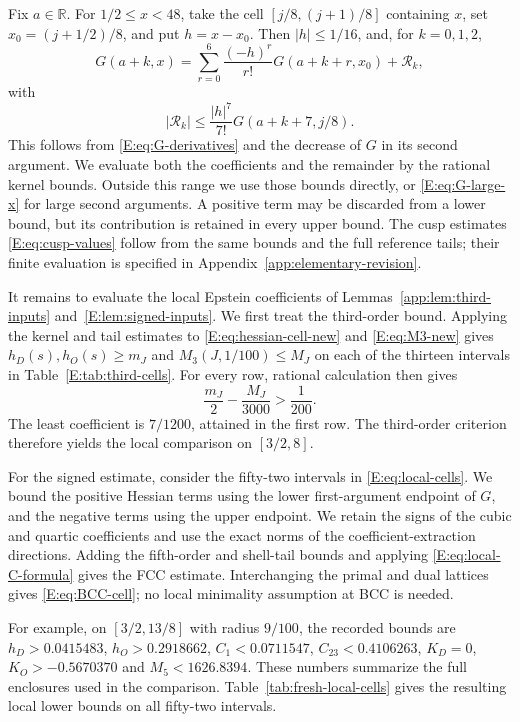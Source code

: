 \documentclass[reqno,english]{amsart}
\theoremstyle{definition}
\newtheorem{open problem}[theorem]{Open Problem}
\theoremstyle{remark}
\theoremstyle{plain}
\newcommand{\R}{{\mathbb R}}
\numberwithin{equation}{section}
\begin{document}
Fix $a\in\R$. For $1/2\le x<48$, take the cell
$[j/8,(j+1)/8]$ containing $x$, set $x_0=(j+1/2)/8$, and put
$h=x-x_0$. Then $|h|\le1/16$, and, for $k=0,1,2$,
\begin{equation}
 G(a+k,x)=\sum_{r=0}^{6}\frac{(-h)^r}{r!}G(a+k+r,x_0)+\mathcal R_k,
 \label{E:eq:kernel-Taylor}
\end{equation}
with
\begin{equation}
 |\mathcal R_k|\le\frac{|h|^7}{7!}G(a+k+7,j/8).
 \label{E:eq:kernel-Taylor-error}
\end{equation}
This follows from \eqref{E:eq:G-derivatives} and the decrease of
$G$ in its second argument. We evaluate both the coefficients and the
remainder by the rational kernel bounds. Outside this range we use
those bounds directly, or \eqref{E:eq:G-large-x} for large second
arguments. A positive term may be discarded from a lower bound, but
its contribution is retained in every upper bound. The cusp estimates
\eqref{E:eq:cusp-values} follow from the same bounds and the full
reference tails; their finite evaluation is specified in
Appendix~\ref{app:elementary-revision}.

It remains to evaluate the local Epstein coefficients of
Lemmas~\ref{app:lem:third-inputs} and~\ref{E:lem:signed-inputs}.
We first treat the third-order bound. Applying the kernel and tail
estimates to \eqref{E:eq:hessian-cell-new} and \eqref{E:eq:M3-new}
gives $h_D(s),h_O(s)\ge m_J$ and $M_3(J,1/100)\le M_J$ on each
of the thirteen intervals in Table~\ref{E:tab:third-cells}.
For every row, rational calculation then gives
\[
 \frac{m_J}{2}-\frac{M_J}{3000}>\frac1{200}.
\]
The least coefficient is $7/1200$, attained in the first row.
The third-order criterion therefore yields the local comparison on
$[3/2,8]$.

For the signed estimate, consider the fifty-two intervals in
\eqref{E:eq:local-cells}. We bound the positive Hessian terms using
the lower first-argument endpoint of $G$, and the negative terms using
the upper endpoint. We retain the signs of the cubic and quartic
coefficients and use the exact norms of the coefficient-extraction
directions. Adding the fifth-order and shell-tail bounds and applying
\eqref{E:eq:local-C-formula} gives the FCC estimate. Interchanging the
primal and dual lattices gives \eqref{E:eq:BCC-cell}; no local
minimality assumption at BCC is needed.

For example, on $[3/2,13/8]$ with radius $9/100$, the recorded bounds
are $h_D>0.0415483$, $h_O>0.2918662$, $C_1<0.0711547$,
$C_{23}<0.4106263$, $K_D=0$, $K_O>-0.5670370$ and
$M_5<1626.8394$. These numbers summarize the full enclosures used in
the comparison. Table~\ref{tab:fresh-local-cells} gives the resulting
local lower bounds on all fifty-two intervals.
\end{document}
